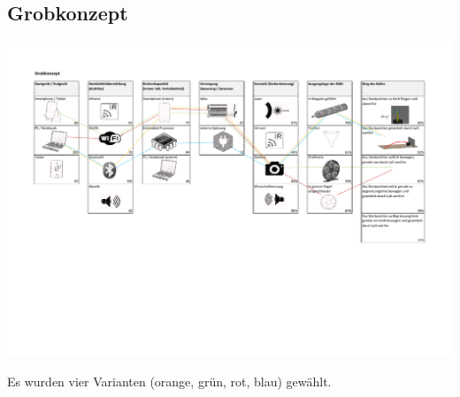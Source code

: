 \begin{landscape}
	\section{Grobkonzept}	
		\includegraphics[page=1,scale=0.825,clip,trim=17mm 75mm 18mm 26mm]{Morphologie/Bilder/Grobkonzept.pdf}
\end{landscape} 
Es wurden vier Varianten (orange, grün, rot, blau) gewählt. 
